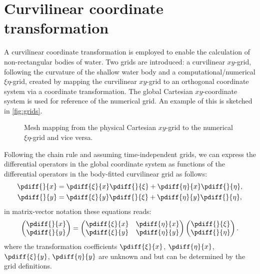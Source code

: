 \chapter{Curvilinear coordinate transformation}\label{app:CoordinateTransform}
A curvilinear coordinate transformation is employed to enable the calculation of non-rectangular bodies of water.
Two grids are introduced: a curvilinear $xy$-grid, following the curvature of the shallow water body and a computational/numerical $\xi \eta$-grid, created by mapping the curvilinear $xy$-grid to an orthogonal coordinate system via a coordinate transformation.
The global Cartesian $xy$-coordinate system is used for reference of the numerical grid.
An example of this is sketched in \autoref{fig:grids}.
%
\begin{figure}[H]
    \begin{center}
        \def\svgwidth{0.80\textwidth} %
        \resizebox{0.99\textwidth}{!}{
            
        }
    \end{center}
	\caption{Mesh mapping from the physical Cartesian $xy$-grid to the numerical $\xi\eta$-grid and vice versa.}
\label{fig:grids}
\end{figure}
%
Following the chain rule and assuming time-independent grids, we can express the differential operators in the global coordinate system as functions of the differential operators in the body-fitted curvilinear grid as follows:
%
\begin{align}\label{1ordertransx}
	\pdiff{}{x} &= \pdiff{\xi}{x} \pdiff{}{\xi}+\pdiff{\eta}{x}\pdiff{}{\eta},
\\
 \label{1ordertransy}
	\pdiff{}{y} &= \pdiff{\xi}{y}\pdiff{}{\xi}+\pdiff{\eta}{y}\pdiff{}{\eta},
\end{align}
in matrix-vector notation these equations reads:
\begin{align}
    \begin{pmatrix} \pdiff{}{x} \\ \pdiff{}{y} \end{pmatrix}
    =
    \begin{pmatrix}
        \pdiff{\xi}{x} &
        \pdiff{\eta}{x} \\
        \pdiff{\xi}{y} &
        \pdiff{\eta}{y}
    \end{pmatrix}
    \begin{pmatrix} \pdiff{}{\xi} \\ \pdiff{}{\eta} \end{pmatrix}.
    \label{eq:grid_transformation}
\end{align}
%
where the transformation coefficients $\pdiff{\xi}{x}$, $\pdiff{\eta}{x}$, $\pdiff{\xi}{y}$, $\pdiff{\eta}{y}$ are unknown and but can be determined by the grid definitions.

